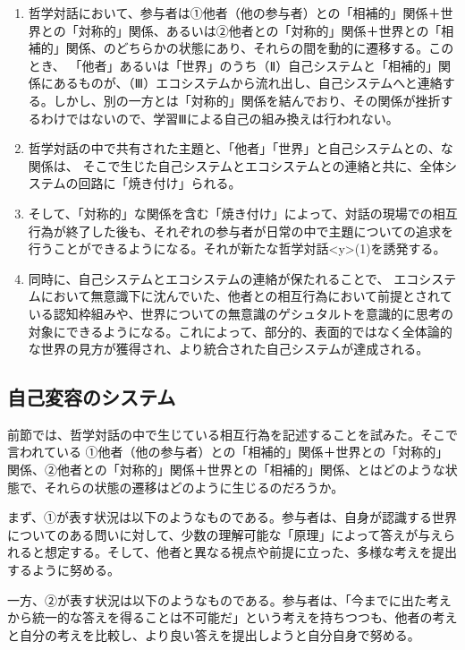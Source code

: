 \documentclass[9pt,b5j,twoside,twocolumn]{utarticle}
\begin{document}
\begin{enumerate}
\renewcommand{\labelenumi}{\pbox<y>{(\arabic{enumi})}}
 \setlength{\itemsep}{-2mm} 
\item 哲学対話において、参与者は①他者（他の参与者）との「相補的」関係＋世界との「対称的」関係、あるいは②他者との「対称的」関係＋世界との「相補的」関係、のどちらかの状態にあり、それらの間を動的に遷移する。このとき、
「他者」あるいは「世界」のうち（Ⅱ）自己システムと「相補的」関係にあるものが、（Ⅲ）エコシステムから流れ出し、自己システムへと連絡する。しかし、別の一方とは「対称的」関係を結んでおり、その関係が挫折するわけではないので、学習Ⅲによる自己の組み換えは行われない。
\item 哲学対話の中で共有された主題と、「他者」「世界」と自己システムとの、な関係は、
そこで生じた自己システムとエコシステムとの連絡と共に、全体システムの回路に「焼き付け」られる。
\item そして、「対称的」な関係を含む「焼き付け」によって、対話の現場での相互行為が終了した後も、それぞれの参与者が日常の中で主題についての追求を行うことができるようになる。それが新たな哲学対話\pbox<y>{(1)}を誘発する。
\item 同時に、自己システムとエコシステムの連絡が保たれることで、
エコシステムにおいて無意識下に沈んでいた、他者との相互行為において前提とされている認知枠組みや、世界についての無意識のゲシュタルトを意識的に思考の対象にできるようになる。これによって、部分的、表面的ではなく全体論的な世界の見方が獲得され、より統合された自己システムが達成される。
\end{enumerate}


\subsection{自己変容のシステム}
前節では、哲学対話の中で生じている相互行為を記述することを試みた。そこで言われている
①他者（他の参与者）との「相補的」関係＋世界との「対称的」関係、②他者との「対称的」関係＋世界との「相補的」関係、とはどのような状態で、それらの状態の遷移はどのように生じるのだろうか。


まず、①が表す状況は以下のようなものである。参与者は、自身が認識する世界についてのある問いに対して、少数の理解可能な「原理」によって答えが与えられると想定する。そして、他者と異なる視点や前提に立った、多様な考えを提出するように努める。


一方、②が表す状況は以下のようなものである。参与者は、「今までに出た考えから統一的な答えを得ることは不可能だ」という考えを持ちつつも、他者の考えと自分の考えを比較し、より良い答えを提出しようと自分自身で努める。
\end{document}
